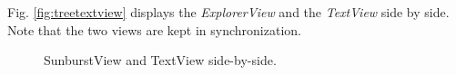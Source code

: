 \begin{itemize}
Fig. \ref{fig:treetextview} displays the \emph{ExplorerView} and the \emph{TextView} side by side. Note that the two views are kept in synchronization.

\begin{figure}[tb]
\caption{\label{fig:sunbursttextview} SunburstView and TextView side-by-side.}
\end{figure}


\end{itemize}
